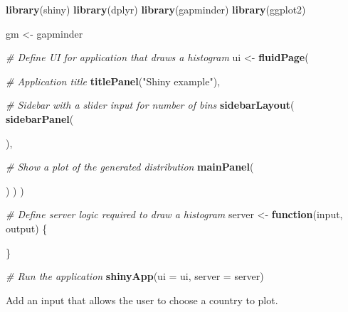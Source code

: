 \documentclass[
]{book}
\newenvironment{Shaded}{\begin{snugshade}}{\end{snugshade}}
\newcommand{\CommentTok}[1]{\textcolor[rgb]{0.56,0.35,0.01}{\textit{#1}}}
\newcommand{\ControlFlowTok}[1]{\textcolor[rgb]{0.13,0.29,0.53}{\textbf{#1}}}
\newcommand{\DataTypeTok}[1]{\textcolor[rgb]{0.13,0.29,0.53}{#1}}
\newcommand{\KeywordTok}[1]{\textcolor[rgb]{0.13,0.29,0.53}{\textbf{#1}}}
\newcommand{\NormalTok}[1]{#1}
\newcommand{\StringTok}[1]{\textcolor[rgb]{0.31,0.60,0.02}{#1}}
\begin{document}
\begin{Shaded}
\begin{Highlighting}[]

\KeywordTok{library}\NormalTok{(shiny)}
\KeywordTok{library}\NormalTok{(dplyr)}
\KeywordTok{library}\NormalTok{(gapminder)}
\KeywordTok{library}\NormalTok{(ggplot2)}

\NormalTok{gm <-}\StringTok{ }\NormalTok{gapminder}

\CommentTok{# Define UI for application that draws a histogram}
\NormalTok{ui <-}\StringTok{ }\KeywordTok{fluidPage}\NormalTok{(}

    \CommentTok{# Application title}
    \KeywordTok{titlePanel}\NormalTok{(}\StringTok{"Shiny example"}\NormalTok{),}

    \CommentTok{# Sidebar with a slider input for number of bins }
    \KeywordTok{sidebarLayout}\NormalTok{(}
        \KeywordTok{sidebarPanel}\NormalTok{(}
            
\NormalTok{        ),}

        \CommentTok{# Show a plot of the generated distribution}
        \KeywordTok{mainPanel}\NormalTok{(}
          
\NormalTok{        )}
\NormalTok{    )}
\NormalTok{)}

\CommentTok{# Define server logic required to draw a histogram}
\NormalTok{server <-}\StringTok{ }\ControlFlowTok{function}\NormalTok{(input, output) \{}

\NormalTok{\}}

\CommentTok{# Run the application }
\KeywordTok{shinyApp}\NormalTok{(}\DataTypeTok{ui =}\NormalTok{ ui, }\DataTypeTok{server =}\NormalTok{ server)}
\end{Highlighting}
\end{Shaded}

Add an input that allows the user to choose a country to plot.
\end{document}
